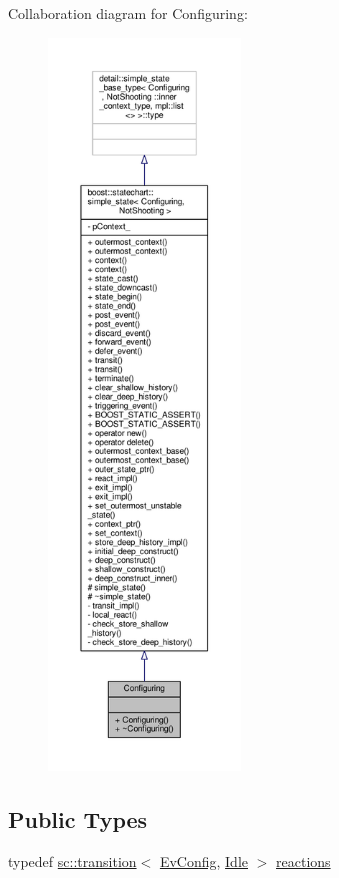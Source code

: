 Collaboration diagram for Configuring\+:
\nopagebreak
\begin{figure}[H]
\begin{center}
\leavevmode
\includegraphics[height=550pt]{struct_configuring__coll__graph}
\end{center}
\end{figure}
\subsection*{Public Types}
\begin{DoxyCompactItemize}
\item 
typedef \mbox{\hyperlink{classboost_1_1statechart_1_1transition}{sc\+::transition}}$<$ \mbox{\hyperlink{struct_ev_config}{Ev\+Config}}, \mbox{\hyperlink{struct_idle}{Idle}} $>$ \mbox{\hyperlink{struct_configuring_a93222b59f6f021c31de6c611549df0f8}{reactions}}
\end{DoxyCompactItemize}
